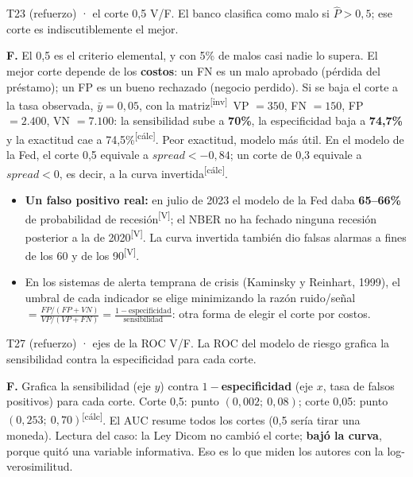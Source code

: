 \documentclass[10pt,a4paper]{article}
\newcommand{\V}{\textsuperscript{\textcolor{green!45!black}{[V]}}}
\newcommand{\inv}{\textsuperscript{\textcolor{red!60!black}{[inv]}}}
\newcommand{\calc}{\textsuperscript{\textcolor{blue!60!black}{[cálc]}}}
\newcommand{\Ph}{\hat P}
\begin{document}
\begin{enun}{T23 (refuerzo) · el corte 0,5}
V/F. El banco clasifica como malo si $\Ph>0{,}5$; ese corte es indiscutiblemente el mejor.
\end{enun}
\begin{ejemplar}
\textbf{F.} El 0,5 es el criterio elemental, y con 5\% de malos casi nadie lo supera. El mejor corte depende de los \textbf{costos}: un FN es un malo aprobado (pérdida del préstamo); un FP es un bueno rechazado (negocio perdido). Si se baja el corte a la tasa observada, $\bar y=0{,}05$, con la matriz\inv\ VP $=350$, FN $=150$, FP $=2.400$, VN $=7.100$: la sensibilidad sube a \textbf{70\%}, la especificidad baja a \textbf{74,7\%} y la exactitud cae a 74,5\%\calc. Peor exactitud, modelo más útil. En el modelo de la Fed, el corte 0,5 equivale a $spread<-0{,}84$; un corte de 0,3 equivale a $spread<0$, es decir, a la curva invertida\calc.
\end{ejemplar}
\begin{trampa}
\begin{itemize}[leftmargin=*,itemsep=0pt,topsep=0pt]
\item \textbf{Un falso positivo real:} en julio de 2023 el modelo de la Fed daba \textbf{65--66\%} de probabilidad de recesión\V; el NBER no ha fechado ninguna recesión posterior a la de 2020\V. La curva invertida también dio falsas alarmas a fines de los 60 y de los 90\V.
\item En los sistemas de alerta temprana de crisis (Kaminsky y Reinhart, 1999), el umbral de cada indicador se elige minimizando la razón ruido/señal $=\frac{FP/(FP+VN)}{VP/(VP+FN)}=\frac{1-\text{especificidad}}{\text{sensibilidad}}$: otra forma de elegir el corte por costos.
\end{itemize}
\end{trampa}

\begin{enun}{T27 (refuerzo) · ejes de la ROC}
V/F. La ROC del modelo de riesgo grafica la sensibilidad contra la especificidad para cada corte.
\end{enun}
\begin{ejemplar}
\textbf{F.} Grafica la sensibilidad (eje $y$) contra \textbf{$1-$especificidad} (eje $x$, tasa de falsos positivos) para cada corte. Corte 0,5: punto $(0{,}002;\ 0{,}08)$; corte 0,05: punto $(0{,}253;\ 0{,}70)$\calc. El AUC resume todos los cortes (0,5 sería tirar una moneda). Lectura del caso: la Ley Dicom no cambió el corte; \textbf{bajó la curva}, porque quitó una variable informativa. Eso es lo que miden los autores con la log-verosimilitud.
\end{ejemplar}
\end{document}
